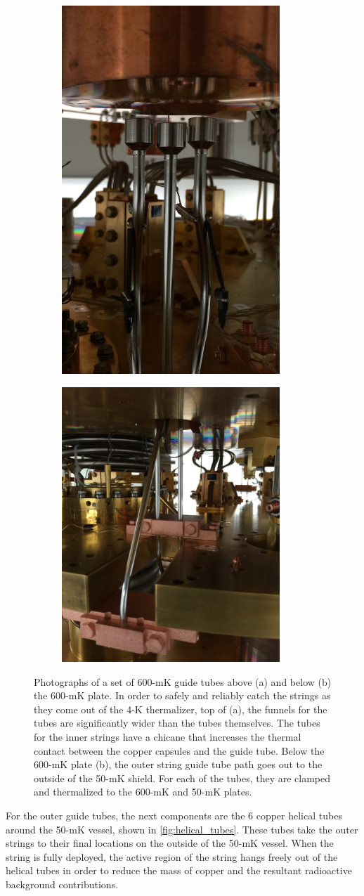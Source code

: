 \begin{figure}[htbp]
\centering
\begin{subfigure}[t]{0.37\textwidth}
\centering
\includegraphics[width=0.9\textwidth, height= 3 in, keepaspectratio]{Figures/600mKguidetube_cropped.jpg}
\caption{}
\label{fig:600mk_guide_tubes_top}
\end{subfigure}
\qquad
\begin{subfigure}[t]{0.5\textwidth}
\centering
\includegraphics[width=0.9\textwidth, height = 3 in, keepaspectratio]{Figures/600mKguidetube_below_cropped.jpg}
\caption{}
\label{fig:600mk_guide_tubes_bottom}
\end{subfigure}
\caption[Photographs of a set of 600-mK guide tubes above (a) and below (b) the 600-mK plate.]
{Photographs of a set of 600-mK guide tubes above (a) and below (b) the 600-mK plate.
In order to safely and reliably catch the strings as they come out of the 4-K thermalizer, top of (a), the funnels for the tubes are significantly wider than the tubes themselves.
The tubes for the inner strings have a chicane that increases the thermal contact between the copper capsules and the guide tube.
Below the 600-mK plate (b), the outer string guide tube path goes out to the outside of the 50-mK shield.
For each of the tubes, they are clamped and thermalized to the 600-mK and 50-mK plates.}
\label{fig:600mK_guide_tubes}
\end{figure}
For the outer guide tubes, the next components are the 6 copper helical tubes around the 50-mK vessel, shown in \autoref{fig:helical_tubes}.
These tubes take the outer strings to their final locations on the outside of the 50-mK vessel.
When the string is fully deployed, the active region of the string hangs freely out of the helical tubes in order to reduce the mass of copper and the resultant radioactive background contributions.

